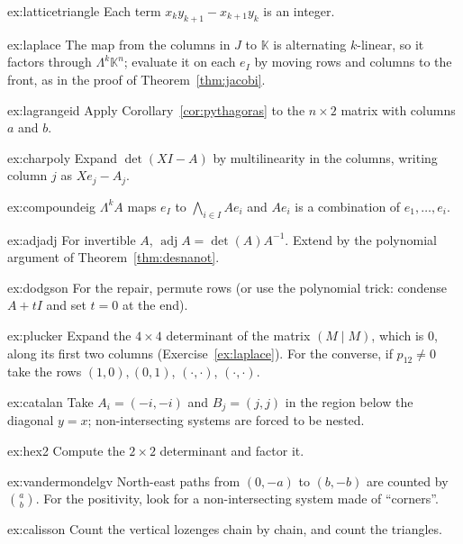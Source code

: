 \begin{hint}{ex:latticetriangle}
Each term $x_ky_{k+1}-x_{k+1}y_k$ is an integer.
\end{hint}
\begin{hint}{ex:laplace}
The map from the columns in $J$ to $\mathbb K$ is alternating $k$-linear, so it factors through $\Lambda^k\mathbb K^n$; evaluate
it on each $e_I$ by moving rows and columns to the front, as in the proof of Theorem~\ref{thm:jacobi}.
\end{hint}
\begin{hint}{ex:lagrangeid}
Apply Corollary~\ref{cor:pythagoras} to the $n\times2$ matrix with columns $a$ and $b$.
\end{hint}
\begin{hint}{ex:charpoly}
Expand $\det(XI-A)$ by multilinearity in the columns, writing column $j$ as $Xe_j-A_j$.
\end{hint}
\begin{hint}{ex:compoundeig}
$\Lambda^kA$ maps $e_I$ to $\bigwedge_{i\in I}Ae_i$ and $Ae_i$ is a combination of $e_1,\dots,e_i$.
\end{hint}
\begin{hint}{ex:adjadj}
For invertible $A$, $\operatorname{adj}A=\det(A)A^{-1}$. Extend by the polynomial argument of Theorem~\ref{thm:desnanot}.
\end{hint}
\begin{hint}{ex:dodgson}
For the repair, permute rows (or use the polynomial trick: condense $A+tI$ and set $t=0$ at the end).
\end{hint}
\begin{hint}{ex:plucker}
Expand the $4\times4$ determinant of the matrix $(M\mid M)$, which is $0$, along its first two columns
(Exercise~\ref{ex:laplace}). For the converse, if $p_{12}\ne0$ take the rows $(1,0),(0,1)$, $(\cdot,\cdot)$, $(\cdot,\cdot)$.
\end{hint}
\begin{hint}{ex:catalan}
Take $A_i=(-i,-i)$ and $B_j=(j,j)$ in the region below the diagonal $y=x$; non-intersecting systems are forced to be
nested.
\end{hint}
\begin{hint}{ex:hex2}
Compute the $2\times2$ determinant and factor it.
\end{hint}
\begin{hint}{ex:vandermondelgv}
North-east paths from $(0,-a)$ to $(b,-b)$ are counted by $\binom ab$. For the positivity, look for a non-intersecting
system made of ``corners''.
\end{hint}
\begin{hint}{ex:calisson}
Count the vertical lozenges chain by chain, and count the triangles.
\end{hint}

